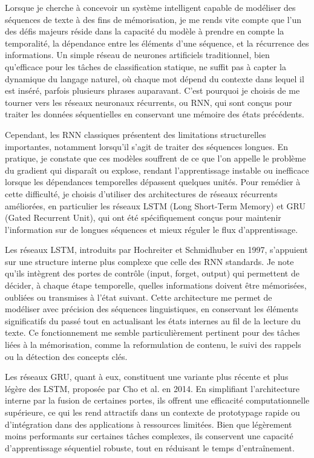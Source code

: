 \documentclass[11pt,a4paper]{report}
\begin{document}
Lorsque je cherche à concevoir un système intelligent capable de modéliser des séquences de texte à des fins de mémorisation, je me rends vite compte que l’un des défis majeurs réside dans la capacité du modèle à prendre en compte la temporalité, la dépendance entre les éléments d’une séquence, et la récurrence des informations. Un simple réseau de neurones artificiels traditionnel, bien qu’efficace pour les tâches de classification statique, ne suffit pas à capter la dynamique du langage naturel, où chaque mot dépend du contexte dans lequel il est inséré, parfois plusieurs phrases auparavant. C’est pourquoi je choisis de me tourner vers les réseaux neuronaux récurrents, ou RNN, qui sont conçus pour traiter les données séquentielles en conservant une mémoire des états précédents.

Cependant, les RNN classiques présentent des limitations structurelles importantes, notamment lorsqu’il s’agit de traiter des séquences longues. En pratique, je constate que ces modèles souffrent de ce que l’on appelle le problème du gradient qui disparaît ou explose, rendant l’apprentissage instable ou inefficace lorsque les dépendances temporelles dépassent quelques unités. Pour remédier à cette difficulté, je choisis d’utiliser des architectures de réseaux récurrents améliorées, en particulier les réseaux LSTM (Long Short-Term Memory) et GRU (Gated Recurrent Unit), qui ont été spécifiquement conçus pour maintenir l’information sur de longues séquences et mieux réguler le flux d’apprentissage.

Les réseaux LSTM, introduits par Hochreiter et Schmidhuber en 1997, s’appuient sur une structure interne plus complexe que celle des RNN standards. Je note qu’ils intègrent des portes de contrôle (input, forget, output) qui permettent de décider, à chaque étape temporelle, quelles informations doivent être mémorisées, oubliées ou transmises à l’état suivant. Cette architecture me permet de modéliser avec précision des séquences linguistiques, en conservant les éléments significatifs du passé tout en actualisant les états internes au fil de la lecture du texte. Ce fonctionnement me semble particulièrement pertinent pour des tâches liées à la mémorisation, comme la reformulation de contenu, le suivi des rappels ou la détection des concepts clés.

Les réseaux GRU, quant à eux, constituent une variante plus récente et plus légère des LSTM, proposée par Cho et al. en 2014. En simplifiant l’architecture interne par la fusion de certaines portes, ils offrent une efficacité computationnelle supérieure, ce qui les rend attractifs dans un contexte de prototypage rapide ou d’intégration dans des applications à ressources limitées. Bien que légèrement moins performants sur certaines tâches complexes, ils conservent une capacité d’apprentissage séquentiel robuste, tout en réduisant le temps d’entraînement.
\end{document}
